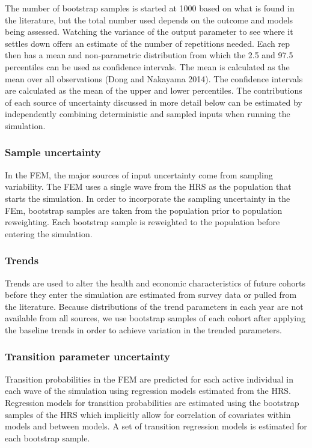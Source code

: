 The number of bootstrap samples is started at 1000 based on what is found in the literature, but the total number used depends on the outcome 
and models being assessed. Watching the variance of the output parameter to see where it settles down offers an estimate of the number of 
repetitions needed. Each rep then has a mean and non-parametric distribution from which the 2.5 and 97.5 percentiles can be used as confidence 
intervals. The mean is calculated as the mean over all observations (Dong and Nakayama 2014). The confidence intervals are calculated as the 
mean of the upper and lower percentiles. The contributions of each source of uncertainty discussed in more detail below can be estimated by 
independently combining deterministic and sampled inputs when running the simulation. 

\subsubsection{Sample uncertainty}
In the FEM, the major sources of input uncertainty come from sampling variability. The FEM uses a single wave from the HRS as the population that 
starts the simulation. In order to incorporate the sampling uncertainty in the FEm, bootstrap samples are taken from the population prior to 
population reweighting. Each bootstrap sample is reweighted to the population  before entering the simulation. 

\subsubsection{Trends}
Trends are used to alter the health and economic characteristics of future cohorts before they enter the simulation are estimated from survey data or 
pulled from the literature. Because distributions of the trend parameters in each year are not available from all sources, we use 
bootstrap samples of each cohort after applying the baseline trends in order to achieve variation in the trended parameters. 

\subsubsection{Transition parameter uncertainty}
Transition probabilities in the FEM are predicted for each active individual in each wave of the simulation using regression models 
estimated from the HRS. Regression models for transition probabilities are estimated using the bootstrap samples of the HRS which 
implicitly allow for correlation of covariates within models and between models. A set of transition regression models is estimated 
for each bootstrap sample.

